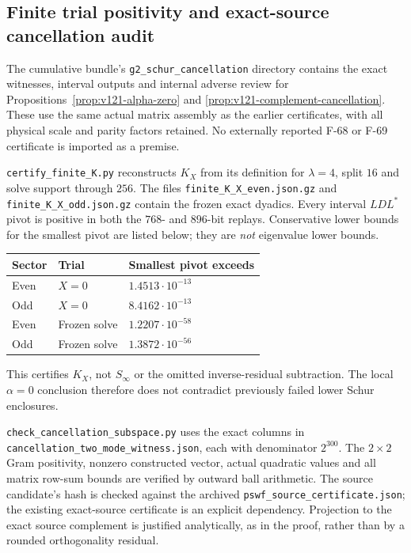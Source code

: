 \documentclass[11pt]{article}
\theoremstyle{remark}
\begin{document}
\subsection*{Finite trial positivity and exact-source cancellation audit}
\label{app:v121-audit}
The cumulative bundle's \texttt{g2\_schur\_cancellation} directory
contains the exact witnesses, interval outputs and internal adverse
review for Propositions~\ref{prop:v121-alpha-zero} and
\ref{prop:v121-complement-cancellation}. These use the same actual
matrix assembly as the earlier certificates, with all physical scale
and parity factors retained. No externally reported F-68 or F-69
certificate is imported as a premise.

\texttt{certify\_finite\_K.py} reconstructs $K_X$ from its definition
for $\lambda=4$, split $16$ and solve support through $256$.
The files \texttt{finite\_K\_X\_even.json.gz} and
\texttt{finite\_K\_X\_odd.json.gz} contain the frozen exact dyadics.
Every interval $LDL^*$ pivot is positive in both the $768$- and
$896$-bit replays. Conservative lower bounds for the smallest pivot
are listed below; they are \emph{not} eigenvalue lower bounds.
\begin{center}
\begin{tabular}{@{}lll@{}}
\toprule Sector & Trial & Smallest pivot exceeds\\\midrule
Even & $X=0$ & $1.4513\cdot10^{-13}$\\
Odd & $X=0$ & $8.4162\cdot10^{-13}$\\
Even & Frozen solve & $1.2207\cdot10^{-58}$\\
Odd & Frozen solve & $1.3872\cdot10^{-56}$\\\bottomrule
\end{tabular}
\end{center}
This certifies $K_X$, not $S_\infty$ or the omitted inverse-residual
subtraction. The local $\alpha=0$ conclusion therefore does not
contradict previously failed lower Schur enclosures.

\nolinkurl{check_cancellation_subspace.py} uses the exact columns in
\nolinkurl{cancellation_two_mode_witness.json}, each with denominator
$2^{300}$. The $2\times2$ Gram positivity, nonzero constructed vector,
actual quadratic values and all matrix row-sum bounds are verified by
outward ball arithmetic. The source candidate's hash is checked
against the archived \texttt{pswf\_source\_certificate.json}; the
existing exact-source certificate is an explicit dependency.
Projection to the exact source complement is justified analytically,
as in the proof, rather than by a rounded orthogonality residual.
\end{document}
